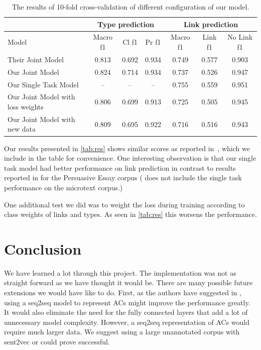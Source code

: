 \documentclass[onecolumn]{article}
\begin{document}
\begin{table}[h]
    \centering
    \begin{tabular}{| l || c | c | c | c | c | c |}
        \hline
        & \multicolumn{3}{|c|}{Type prediction} & \multicolumn{3}{|c|}{Link prediction} \\ 
        \hline
        Model & Macro f1 & Cl f1 & Pr f1 & Macro f1 & Link f1 & No Link f1 \\
        \hline
        Their Joint Model                 & 0.813 & 0.692 & 0.934 & 0.749 & 0.577 & 0.903 \\
        Our Joint Model                   & 0.824 & 0.714 & 0.934 & 0.737 & 0.526 & 0.947 \\
        Our Single Task Model             &   –   &   –   &   –   & 0.755 & 0.559 & 0.951 \\
        Our Joint Model with loss weights & 0.806 & 0.699 & 0.913 & 0.725 & 0.505 & 0.945 \\
        Our Joint Model with new data     & 0.809 & 0.695 & 0.922 & 0.716 & 0.516 & 0.943 \\
        \hline
    \end{tabular}
    \caption{The results of 10-fold cross-validation of different configuration of our model.}\label{tab:res}
\end{table}

Our results presented in \autoref{tab:res} shows similar scores as reported in~\cite{potash2017here}, which we include in the table for convenience.
One interesting observation is that our single task model had better performance on link prediction in contrast to results reported in \cite{potash2017here} for the Persuasive Essay corpus
(\cite{potash2017here} does not include the single task performance on the microtext corpus.)

One additional test we did was to weight the loss during training according to class weights of links and types.
As seen in \autoref{tab:res} this worsens the performance.

\section{Conclusion}
We have learned a lot through this project.
The implementation was not as straight forward as we have thought it would be.
There are many possible future extensions we would have like to do.
First, as the authors have suggested in \cite{potash2017here}, using a seq2seq model to represent ACs might improve the performance greatly.
It would also eliminate the need for the fully connected layers that add a lot of unnecessary model complexity.
However, a seq2seq representation of ACs would require much larger data.
We suggest using a large unannotated corpus with sent2vec or \cite{sent} could prove successful.
\end{document}
